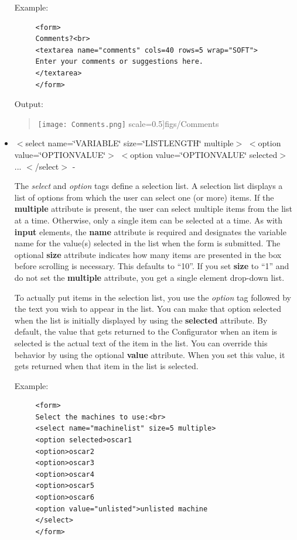 \begin{itemize}
Example:

\begin{footnotesize}
\begin{verbatim}
     <form> 
     Comments?<br> 
     <textarea name="comments" cols=40 rows=5 wrap="SOFT"> 
     Enter your comments or suggestions here. 
     </textarea> 
     </form>
\end{verbatim}
\end{footnotesize}

Output: 

\begin{quote}
\texttt{[image: Comments.png]}
  scale=0.5]{figs/Comments}
\end{quote}
\item $<$select name=\char`\"{}VARIABLE\char`\"{} size=\char`\"{}LISTLENGTH\char`\"{}
multiple$>$ $<$option value=\char`\"{}OPTIONVALUE\char`\"{}$>$ $<$option value=\char`\"{}OPTIONVALUE\char`\"{}
selected$>$ ... $<$/select$>$ - 


The \textit{select} and \textit{option} tags define a selection list.
A selection list displays a list of options from which the user can
select one (or more) items. If the \textbf{multiple} attribute is
present, the user can select multiple items from the list at a time.
Otherwise, only a single item can be selected at a time. As with \textbf{input}
elements, the \textbf{name} attribute is required and designates the
variable name for the value(s) selected in the list when the form
is submitted. The optional \textbf{size} attribute indicates how many
items are presented in the box before scrolling is necessary. This
defaults to {}``10''. If you set \textbf{size} to {}``1'' and
do not set the \textbf{multiple} attribute, you get a single element
drop-down list.

To actually put items in the selection list, you use the \textit{option}
tag followed by the text you wish to appear in the list. You can make
that option selected when the list is initially displayed by using
the \textbf{selected} attribute. By default, the value that gets returned
to the Configurator when an item is selected is the actual text of
the item in the list. You can override this behavior by using the
optional \textbf{value} attribute. When you set this value, it gets
returned when that item in the list is selected.

Example:

\begin{footnotesize}
\begin{verbatim}
     <form> 
     Select the machines to use:<br> 
     <select name="machinelist" size=5 multiple> 
     <option selected>oscar1 
     <option>oscar2 
     <option>oscar3 
     <option>oscar4 
     <option>oscar5 
     <option>oscar6 
     <option value="unlisted">unlisted machine 
     </select> 
     </form>
\end{verbatim}
\end{footnotesize}


\end{itemize}
